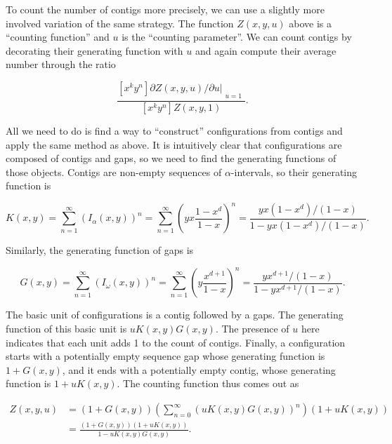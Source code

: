 \documentclass{article}
\begin{document}
To count the number of contigs more precisely, we can use a slightly more
involved variation of the same strategy. The function $Z(x,y,u)$ above is
a ``counting function'' and $u$ is the ``counting parameter''. We can
count contigs by decorating their generating function with $u$ and again
compute their average number through the ratio

\begin{equation*}
\frac{[x^ky^n] \partial Z(x,y,u)/\partial u|_{\substack{\\u=1}}}
{[x^ky^n]Z(x,y,1)}.
\end{equation*}

All we need to do is find a way to ``construct'' configurations from
contigs and apply the same method as above. It is intuitively clear that
configurations are composed of contigs and gaps, so we need to find the
generating functions of those objects. Contigs are non-empty sequences of
$\alpha$-intervals, so their generating function is

\begin{equation*}
K(x,y) = \sum_{n=1}^\infty \left( I_\alpha(x,y) \right)^n
= \sum_{n=1}^\infty \left(yx\frac{1-x^d}{1-x} \right)^n
= \frac{yx(1-x^d)/(1-x)}{1-yx(1-x^d)/(1-x)}.
\end{equation*}

Similarly, the generating function of gaps is

\begin{equation*}
G(x,y) = \sum_{n=1}^\infty \left(I_\omega(x,y) \right)^n
= \sum_{n=1}^\infty \left(y\frac{x^{d+1}}{1-x} \right)^n
= \frac{yx^{d+1}/(1-x)}{1-yx^{d+1}/(1-x)}.
\end{equation*}

The basic unit of configurations is a contig followed by a gaps. The
generating function of this basic unit is $uK(x,y)G(x,y)$. The presence of
$u$ here indicates that each unit adds 1 to the count of contigs. Finally,
a configuration starts with a potentially empty sequence gap whose
generating function is $1+G(x,y)$, and it ends with a potentially empty
contig, whose generating function is $1+uK(x,y)$. The counting function
thus comes out as

\begin{equation*}
\begin{split}
Z(x,y,u) &= \left( 1+G(x,y) \right)
\left( \sum_{n=0}^\infty (uK(x,y)G(x,y))^n \right)
\left( 1+uK(x,y) \right) \\
& = \frac{(1+G(x,y))(1+uK(x,y))}{1-uK(x,y)G(x,y)}.
\end{split}
\end{equation*}
\end{document}
